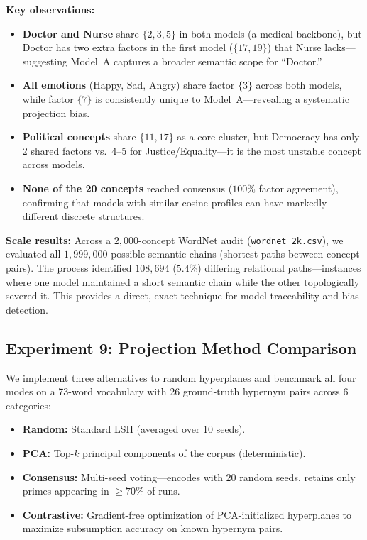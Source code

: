 \documentclass[10pt]{article}
\begin{document}
\noindent\textbf{Key observations:}
\begin{itemize}[nosep, leftmargin=*]
    \item \textbf{Doctor and Nurse} share $\{2,3,5\}$ in both models (a medical backbone), but Doctor has two extra factors in the first model ($\{17,19\}$) that Nurse lacks---suggesting Model~A captures a broader semantic scope for ``Doctor.''
    \item \textbf{All emotions} (Happy, Sad, Angry) share factor $\{3\}$ across both models, while factor $\{7\}$ is consistently unique to Model~A---revealing a systematic projection bias.
    \item \textbf{Political concepts} share $\{11,17\}$ as a core cluster, but Democracy has only 2 shared factors vs.\ 4--5 for Justice/Equality---it is the most unstable concept across models.
    \item \textbf{None of the 20 concepts} reached consensus ($100\%$ factor agreement), confirming that models with similar cosine profiles can have markedly different discrete structures.
\end{itemize}

\textbf{Scale results:} Across a $2{,}000$-concept WordNet audit (\texttt{wordnet\_2k.csv}), we evaluated all $1{,}999{,}000$ possible semantic chains (shortest paths between concept pairs). The process identified $108{,}694$ ($5.4\%$) differing relational paths---instances where one model maintained a short semantic chain while the other topologically severed it. This provides a direct, exact technique for model traceability and bias detection.

\subsection{Experiment 9: Projection Method Comparison}

We implement three alternatives to random hyperplanes and benchmark all four modes on a 73-word vocabulary with 26 ground-truth hypernym pairs across 6 categories:

\begin{itemize}[nosep, leftmargin=*]
    \item \textbf{Random:} Standard LSH (averaged over 10 seeds).
    \item \textbf{PCA:} Top-$k$ principal components of the corpus (deterministic).
    \item \textbf{Consensus:} Multi-seed voting---encodes with 20 random seeds, retains only primes appearing in $\geq70\%$ of runs.
    \item \textbf{Contrastive:} Gradient-free optimization of PCA-initialized hyperplanes to maximize subsumption accuracy on known hypernym pairs.
\end{itemize}
\end{document}
